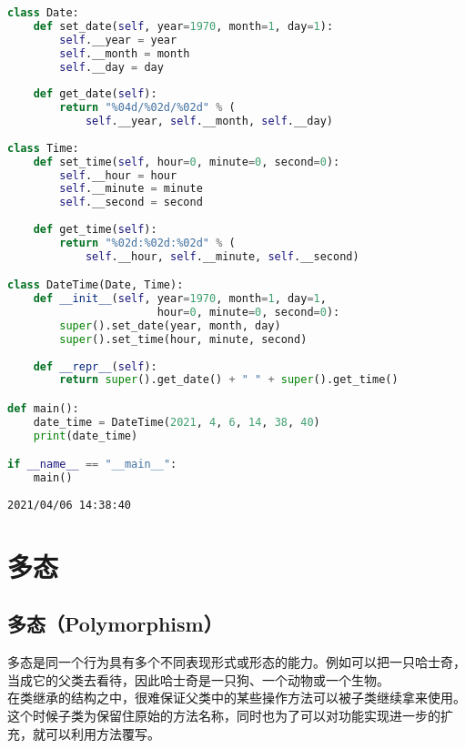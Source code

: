 \begin{lstlisting}[language=Python]
class Date:
    def set_date(self, year=1970, month=1, day=1):
        self.__year = year
        self.__month = month
        self.__day = day
    
    def get_date(self):
        return "%04d/%02d/%02d" % (
            self.__year, self.__month, self.__day)
    
class Time:
    def set_time(self, hour=0, minute=0, second=0):
        self.__hour = hour
        self.__minute = minute
        self.__second = second
    
    def get_time(self):
        return "%02d:%02d:%02d" % (
            self.__hour, self.__minute, self.__second)

class DateTime(Date, Time):
    def __init__(self, year=1970, month=1, day=1, 
                       hour=0, minute=0, second=0):
        super().set_date(year, month, day)
        super().set_time(hour, minute, second)
    
    def __repr__(self):
        return super().get_date() + " " + super().get_time()

def main():
    date_time = DateTime(2021, 4, 6, 14, 38, 40)
    print(date_time)

if __name__ == "__main__":
    main()
\end{lstlisting}

\begin{tcolorbox}
	\begin{verbatim}
2021/04/06 14:38:40
\end{verbatim}
\end{tcolorbox}

\newpage

\section{多态}

\subsection{多态（Polymorphism）}

多态是同一个行为具有多个不同表现形式或形态的能力。例如可以把一只哈士奇，当成它的父类去看待，因此哈士奇是一只狗、一个动物或一个生物。\\

在类继承的结构之中，很难保证父类中的某些操作方法可以被子类继续拿来使用。这个时候子类为保留住原始的方法名称，同时也为了可以对功能实现进一步的扩充，就可以利用方法覆写。\\

